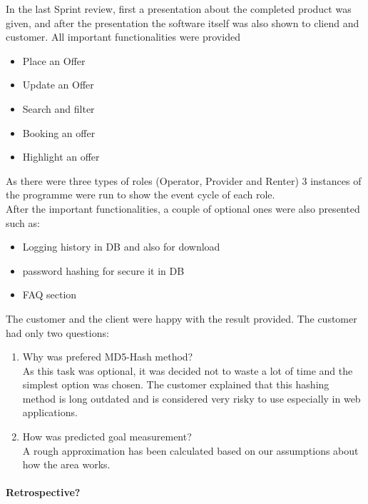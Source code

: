 In the last Sprint review, first a presentation about the completed product was given, and after the presentation the software itself was also shown to cliend and customer. All important functionalities were provided
\begin{itemize}
    \item Place an Offer
    \item Update an Offer
    \item Search and filter
    \item Booking an offer
    \item Highlight an offer
\end{itemize}


As there were three types of roles (Operator, Provider and Renter) 3 instances of the programme were run to show the event cycle of each role.\\

After the important functionalities, a couple of optional ones were also presented such as:
\begin{itemize}
    \item Logging history in DB and also for download
    \item password hashing for secure it in DB
    \item FAQ section
\end{itemize}


The customer and the client were happy with the result provided. The customer had only two questions:

\begin{enumerate}
    \item Why was prefered MD5-Hash method?\\
    As this task was optional, it was decided not to waste a lot of time and the simplest option was chosen. The customer explained that this hashing method is long outdated and is considered very risky to use especially in web applications.
    \item How was predicted goal measurement?\\
    A rough approximation has been calculated based on our assumptions about how the area works.
\end{enumerate}


\paragraph{Retrospective?}